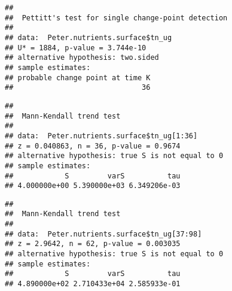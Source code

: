 \documentclass[]{article}
\newenvironment{Shaded}{\begin{snugshade}}{\end{snugshade}}
\newcommand{\KeywordTok}[1]{\textcolor[rgb]{0.13,0.29,0.53}{\textbf{#1}}}
\newcommand{\DecValTok}[1]{\textcolor[rgb]{0.00,0.00,0.81}{#1}}
\newcommand{\CommentTok}[1]{\textcolor[rgb]{0.56,0.35,0.01}{\textit{#1}}}
\newcommand{\OperatorTok}[1]{\textcolor[rgb]{0.81,0.36,0.00}{\textbf{#1}}}
\newcommand{\NormalTok}[1]{#1}
\begin{document}
\begin{verbatim}
## 
##  Pettitt's test for single change-point detection
## 
## data:  Peter.nutrients.surface$tn_ug
## U* = 1884, p-value = 3.744e-10
## alternative hypothesis: two.sided
## sample estimates:
## probable change point at time K 
##                              36
\end{verbatim}

\begin{Shaded}
\end{Shaded}

\begin{verbatim}
## 
##  Mann-Kendall trend test
## 
## data:  Peter.nutrients.surface$tn_ug[1:36]
## z = 0.040863, n = 36, p-value = 0.9674
## alternative hypothesis: true S is not equal to 0
## sample estimates:
##            S         varS          tau 
## 4.000000e+00 5.390000e+03 6.349206e-03
\end{verbatim}

\begin{Shaded}
\end{Shaded}

\begin{verbatim}
## 
##  Mann-Kendall trend test
## 
## data:  Peter.nutrients.surface$tn_ug[37:98]
## z = 2.9642, n = 62, p-value = 0.003035
## alternative hypothesis: true S is not equal to 0
## sample estimates:
##            S         varS          tau 
## 4.890000e+02 2.710433e+04 2.585933e-01
\end{verbatim}

\begin{Shaded}
\end{Shaded}
\end{document}
